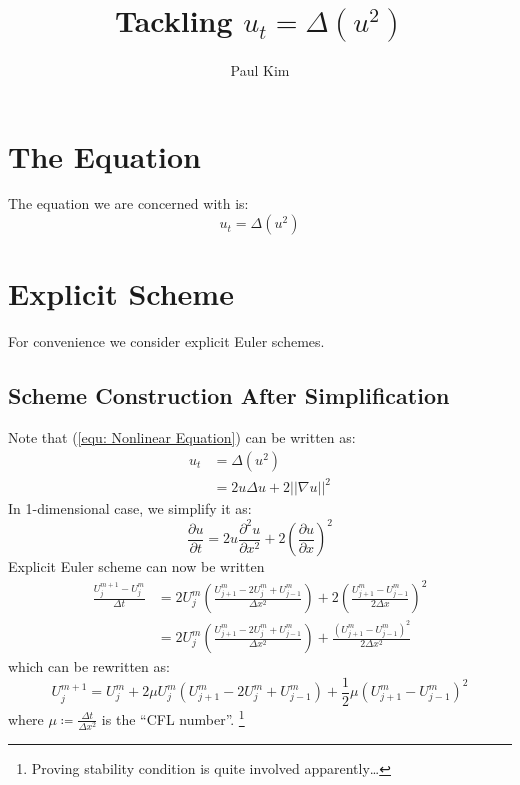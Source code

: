 \documentclass[a4paper]{article}
\title{Tackling $u_{t} = \Delta \left( u^2 \right)$}
\author{Paul Kim}
\begin{document}
\maketitle
\section{The Equation}
The equation we are concerned with is:
\begin{equation}
    u_{t} = \Delta \left( u^2 \right)
    \label{equ: Nonlinear Equation}
\end{equation}

\section{Explicit Scheme}
For convenience we consider explicit Euler schemes.

\subsection{Scheme Construction After Simplification}
Note that (\ref{equ: Nonlinear Equation}) can be written as:
\begin{align}
    u_t &= \Delta \left( u^2 \right) \\
    &= 2 u \Delta u + 2 || \nabla u ||^2
\end{align}
In 1-dimensional case, we simplify it as:
\begin{equation}
    \frac{\partial u}{\partial t} = 2 u \frac{\partial^2 u}{\partial x^2} + 2 \left( \frac{\partial u}{\partial x} \right)^2
\end{equation}
Explicit Euler scheme can now be written
\begin{align}
    \frac{U_j^{m+1} - U_j^m}{\Delta t}
    &= 2 U_j^m \left( \frac{U_{j+1}^m - 2 U_{j}^m + U_{j-1}^m}{\Delta x^2} \right)
    + 2 \left( \frac{U_{j+1}^m - U_{j-1}^m}{2 \Delta x} \right)^2 \\
    &= 2 U_j^m \left( \frac{U_{j+1}^m - 2 U_{j}^m + U_{j-1}^m}{\Delta x^2} \right)
    + \frac{\left( U_{j+1}^m - U_{j-1}^m \right)^2}{2 \Delta x^2}
\end{align}
which can be rewritten as:
\begin{equation}
    U_j^{m+1} = U_j^m + 2 \mu U_j^m \left( U_{j+1}^m - 2 U_{j}^m + U_{j-1}^m \right) 
    + \frac{1}{2} \mu \left( U_{j+1}^m - U_{j-1}^m \right)^2
\end{equation}
where $\mu \coloneqq \frac{\Delta t}{\Delta x^2}$ is the ``CFL number''.
\footnote{Proving stability condition is quite involved apparently\dots}
\end{document}
